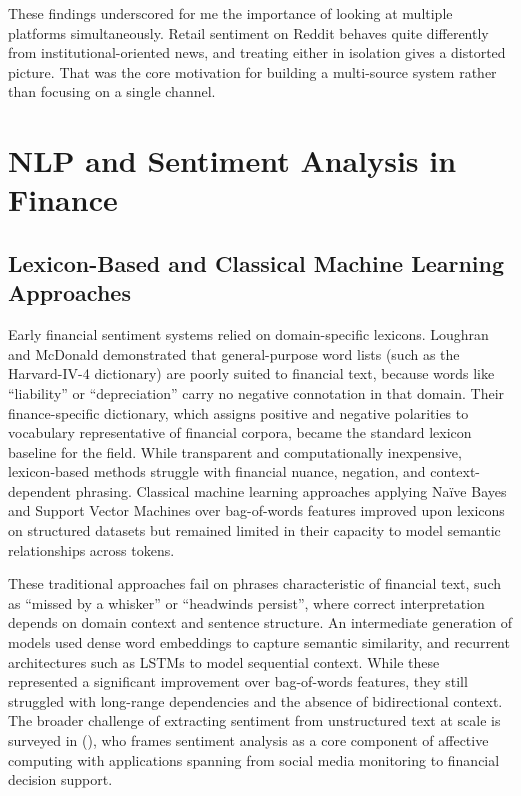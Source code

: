 These findings underscored for me the importance of looking at multiple platforms simultaneously. Retail sentiment on Reddit behaves quite differently from institutional-oriented news, and treating either in isolation gives a distorted picture. That was the core motivation for building a multi-source system rather than focusing on a single channel.

\section{NLP and Sentiment Analysis in Finance}

\subsection*{Lexicon-Based and Classical Machine Learning Approaches}

Early financial sentiment systems relied on domain-specific lexicons.  Loughran and McDonald \citep{loughran2011liability} demonstrated that general-purpose word lists (such as the Harvard-IV-4 dictionary) are poorly suited to financial text, because words like ``liability'' or ``depreciation'' carry no negative connotation in that domain.  Their finance-specific dictionary, which assigns positive and negative polarities to vocabulary representative of financial corpora, became the standard lexicon baseline for the field.  While transparent and computationally inexpensive, lexicon-based methods struggle with financial nuance, negation, and context-dependent phrasing.  Classical machine learning approaches applying Naïve Bayes and Support Vector Machines over bag-of-words features improved upon lexicons on structured datasets \citep{kogan2009predicting} but remained limited in their capacity to model semantic relationships across tokens.

These traditional approaches fail on phrases characteristic of financial text, such as ``missed by a whisker'' or ``headwinds persist'', where correct interpretation depends on domain context and sentence structure.  An intermediate generation of models used dense word embeddings \citep{mikolov2013word2vec, pennington2014glove} to capture semantic similarity, and recurrent architectures such as LSTMs \citep{hochreiter1997lstm} to model sequential context.  While these represented a significant improvement over bag-of-words features, they still struggled with long-range dependencies and the absence of bidirectional context.  The broader challenge of extracting sentiment from unstructured text at scale is surveyed in \citeauthor{cambria2016affective} (\citeyear{cambria2016affective}), who frames sentiment analysis as a core component of affective computing with applications spanning from social media monitoring to financial decision support.

